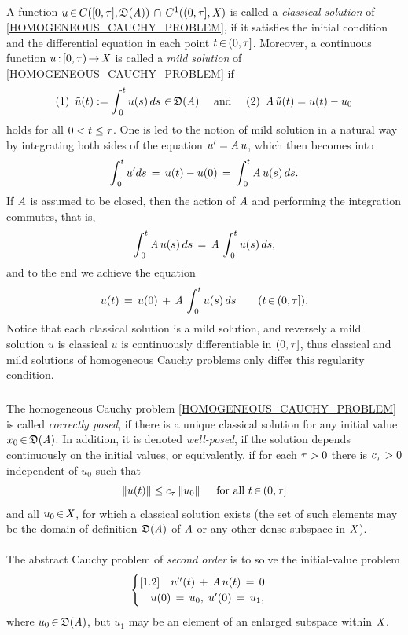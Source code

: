 \documentclass[11pt,twoside]{article}
\begin{document}
\subparagraph*{}
A function $u {\,\in\,} C([0,\tau],\mathfrak{D}(\mathit{A})) \, \cap \, C^1((0,\tau],\mathit{X})$
is called a \textit{classical solution} of \eqref{HOMOGENEOUS_CAUCHY_PROBLEM},
if it satisfies the initial condition and
the differential equation in each point $t {\,\in\,} (0,\tau]$.
Moreover,
a continuous function $u{\,:\,}[0,\tau) {\,\to\,} \mathit{X}$ is called a \textit{mild solution}
of \eqref{HOMOGENEOUS_CAUCHY_PROBLEM} if
\[
\mbox{(1) } \, \tilde{u}(t) := \int_{\,0}^t u(s) \, ds \, {\,\in\,} \mathfrak{D}(\mathit{A})
\quad \mbox{ and } \quad
\mbox{(2) } \, \mathit{A} \, \tilde{u}(t) = u(t)-u_0
\]
holds for all $0 < t \leq \tau$.
One is led to the notion of mild solution in a natural way
by integrating both sides of the equation $u'=\mathit{A} \, u$,
which then becomes into
\[
\int_{\,0}^t u' ds \,=\,
u(t)-u(0) \,=\,
\int_{\,0}^t \mathit{A} \, u(s) \, ds.
\]
If $\mathit{A}$ is assumed to be closed,
then the action of $\mathit{A}$ and performing the integration commutes, that is,
\[
\int_{\,0}^t \mathit{A} \, u(s) \, ds  \,=\, \mathit{A} \, \int_{\,0}^t u(s) \, ds,
\]
and to the end we achieve the equation
\[
u(t) \,=\, u(0) \, + \,  \mathit{A} \, \int_{\,0}^t u(s) \,ds
\quad \quad (t {\,\in\,} (0,\tau]).
\]
Notice that each classical solution is a mild solution,
and reversely a mild solution $u$ is classical
\iff
$u$ is continuously differentiable in $(0,\tau]$,
thus classical and mild solutions of homogeneous Cauchy problems
only differ {\wrt} this regularity condition.

\subparagraph*{}
The homogeneous Cauchy problem \eqref{HOMOGENEOUS_CAUCHY_PROBLEM} 
is called \textit{correctly posed},
if there is a unique classical solution
for any initial value $x_0 {\,\in\,} \mathfrak{D}(\mathit{A})$.
In addition,
it is denoted \textit{well-posed},
if the solution depends continuously on the initial values,
or equivalently,
if for each $\tau > 0$ there is $c_{\tau} > 0$ independent of $u_0$ such that
\[
\left\lVert u(t) \right\rVert \leq c_{\tau} \left\lVert u_0 \right\rVert \quad \mbox{ for all } t {\,\in\,} (0,\tau]
\]
and all $u_0 {\,\in\,} \mathit{X}$,
for which a classical solution exists
(the set of such elements may be the domain of definition $\mathfrak{D}(\mathit{A})$
of $\mathit{A}$ or any other dense subspace in $\mathit{X}$).

\paragraph*{}
The abstract Cauchy problem of \textit{second order}
is to solve the initial-value problem
\begin{equation}\label{HOMOGENEOUS_SECOND_ORDER_CAUCHY_PROBLEM}
\begin{cases}[1.2]
\quad u''(t) \, + \, \mathit{A} \, u(t) \,=\, 0\\
\quad u(0) \,=\, u_0, \; u'(0) \,=\, u_1,\\
\end{cases}
\end{equation}
where $u_0 {\,\in\,} \mathfrak{D}(\mathit{A})$,
but $u_1$ may be an element of an enlarged subspace within $\mathit{X}$.
\end{document}
